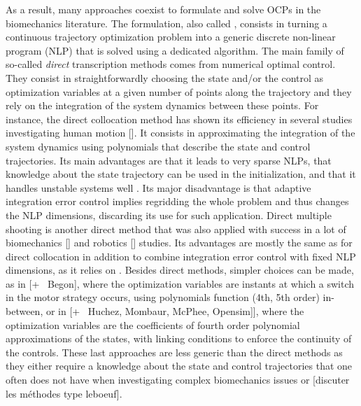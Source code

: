 As a result, many approaches coexist to formulate and solve OCPs in the biomechanics literature. 
The formulation, also called , consists in turning a continuous trajectory optimization problem into a generic discrete non-linear program (NLP) that is solved using a dedicated algorithm. 
The main family of so-called \textit{direct} transcription methods comes from numerical optimal control. 
They consist in straightforwardly choosing the state and/or the control as optimization variables at a given number of points along the trajectory and they rely on the integration of the system dynamics between these points. 
For instance, the direct collocation method has shown its efficiency in several studies investigating human motion [\addref{}]. 
It consists in approximating the integration of the system dynamics using polynomials that describe the state and control trajectories.
Its main advantages are that it leads to very sparse NLPs, that knowledge about the state trajectory can be used in the initialization, and that it handles unstable systems well \cite{diehl2006fast}. 
Its major disadvantage is that adaptive integration error control implies regridding the whole problem and thus changes the NLP dimensions, discarding its use for such application.
Direct multiple shooting is another direct method that was also applied with success in a lot of biomechanics [\addref] and robotics [\addref] studies.
Its advantages are mostly the same as for direct collocation in addition to combine integration error control with fixed NLP dimensions, as it relies on .
Besides direct methods, simpler choices can be made, as in \cite{yeadon2000mechanics} [+ \addref\ Begon], where the optimization variables are instants at which a switch in the motor strategy occurs, using polynomials function (4th, 5th order) in-between, or in \cite{leboeuf2006energetic} [+ \addref\  Huchez, Mombaur, McPhee, Opensim]], where the optimization variables are the coefficients of fourth order polynomial approximations of the states, with linking conditions to enforce the continuity of the controls. 
These last approaches are less generic than the direct methods as they either require a knowledge about the state and control trajectories that one often does not have when investigating complex biomechanics issues or [discuter les méthodes type leboeuf]. 

